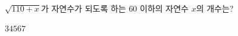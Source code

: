 $\sqrt{110+x}$가 자연수가 되도록 하는 $60$ 이하의 자연수 $x$의 개수는?
\begin{choices32}{$3$}{$4$}{$5$}{$6$}{$7$}\end{choices32}
